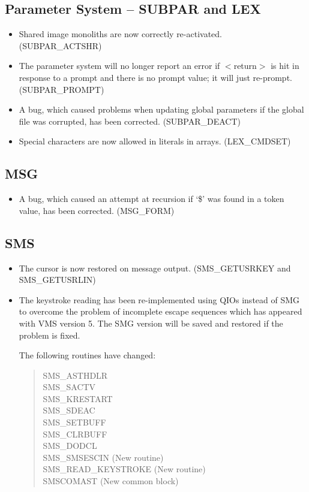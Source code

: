 \subsection{Parameter System -- SUBPAR and LEX}
\begin{itemize}
\item Shared image monoliths are now correctly re-activated. (SUBPAR\_ACTSHR)
\item The parameter system will no longer report an error if $<$return$>$ is 
hit in response to a prompt and there is no prompt value; it will just 
re-prompt. (SUBPAR\_PROMPT)
\item A bug, which caused problems when updating global parameters if the global
file was corrupted, has been corrected. (SUBPAR\_DEACT)
\item Special characters are now allowed in literals in arrays. (LEX\_CMDSET)
\end{itemize}

\subsection{MSG}
\begin{itemize}
\item A bug, which caused an attempt at recursion if `\$' was found in a token
value, has been corrected. (MSG\_FORM)
\end{itemize}

\subsection{SMS}
\begin{itemize}
\item The cursor is now restored on message output. (SMS\_GETUSRKEY and
SMS\_GETUSRLIN)
\item The keystroke reading has been re-implemented using QIOs instead of SMG
to overcome the problem of incomplete escape sequences which has appeared
with VMS version 5.
The SMG version will be saved and restored if the problem is fixed.

The following routines have changed:
\begin{quote}
SMS\_ASTHDLR\\
SMS\_SACTV\\
SMS\_KRESTART\\
SMS\_SDEAC\\
SMS\_SETBUFF\\
SMS\_CLRBUFF\\
SMS\_DODCL\\
SMS\_SMSESCIN (New routine)\\
SMS\_READ\_KEYSTROKE (New routine)\\
SMSCOMAST  (New common block)
\end{quote}
\end{itemize}

